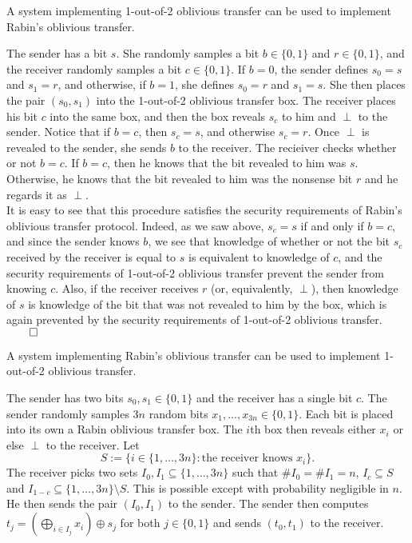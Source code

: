 \begin{lemma}
A system implementing 1-out-of-2 oblivious transfer can be used to implement Rabin's oblivious transfer.
\end{lemma}

\proof
The sender has a bit $s$. She randomly samples a bit $b \in \{0,1\}$ and $r \in \{0,1\}$, and the receiver randomly samples a bit $c \in \{0,1\}$. If $b = 0$, the sender defines $s_0 = s$ and $s_1 = r$, and otherwise, if $b = 1$, she defines $s_0 = r$ and $s_1 = s$. She then places the pair $(s_0, s_1)$ into the 1-out-of-2 oblivious transfer box. The receiver places his bit $c$ into the same box, and then the box reveals $s_c$ to him and $\perp$ to the sender. Notice that if $b = c$, then $s_c = s$, and otherwise $s_c = r$. Once $\perp$ is revealed to the sender, she sends $b$ to the receiver. The recieiver checks whether or not $b = c$. If $b = c$, then he knows that the bit revealed to him was $s$. Otherwise, he knows that the bit revealed to him was the nonsense bit $r$ and he regards it as $\perp$. \\

It is easy to see that this procedure satisfies the security requirements of Rabin's oblivious transfer protocol. Indeed, as we saw above, $s_c = s$ if and only if $b = c$, and since the sender knows $b$, we see that knowledge of whether or not the bit $s_c$ received by the receiver is equal to $s$ is equivalent to knowledge of $c$, and the security requirements of 1-out-of-2 oblivious transfer prevent the sender from knowing $c$. Also, if the receiver receives $r$ (or, equivalently, $\perp$), then knowledge of $s$ is knowledge of the bit that was not revealed to him by the box, which is again prevented by the security requirements of 1-out-of-2 oblivious transfer.  $\qed$

\begin{lemma}
A system implementing Rabin's oblivious transfer can be used to implement 1-out-of-2 oblivious transfer.
\end{lemma}

\proofsketch
The sender has two bits $s_0, s_1 \in \{0,1\}$ and the receiver has a single bit $c$. The sender randomly samples $3n$ random bits $x_1, \dotsc, x_{3n} \in \{0,1\}$. Each bit is placed into its own a Rabin oblivious transfer box. The $i$th box then reveals either $x_i$ or else $\perp$ to the receiver. Let 
\[ S := \{i \in \{1, \dotsc, 3n\} : \text{the receiver knows } x_i\}. \]
The receiver picks two sets $I_0, I_1 \subseteq \{1, \dotsc, 3n\}$ such that $\# I_0 = \# I_1 = n$, $I_c \subseteq S$ and $I_{1-c} \subseteq \{1, \dotsc, 3n\} \setminus S$. This is possible except with probability negligible in $n$. He then sends the pair $(I_0, I_1)$ to the sender. The sender then computes $t_j= \left(\bigoplus_{i \in I_j}x_i \right) \oplus s_j$ for both $j \in \{0,1\}$ and sends $(t_0, t_1)$ to the receiver. \\

